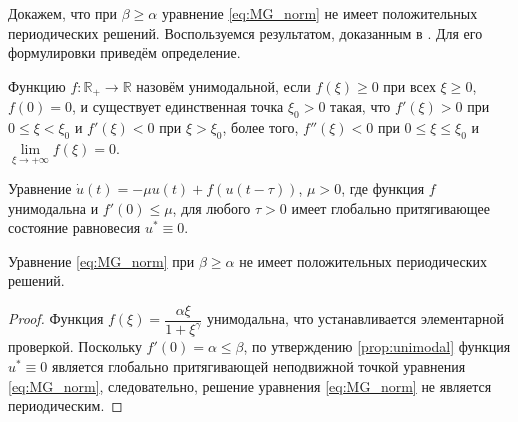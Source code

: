Докажем, что при $\beta \geq \alpha$ уравнение \eqref{eq:MG_norm} не имеет положительных периодических решений. Воспользуемся результатом, доказанным в \cite[Proposition 3.1]{Roest2007}. Для его формулировки приведём определение.

\begin{definition}
	Функцию $f: \mathbb{R}_{+} \to \mathbb{R}$ назовём унимодальной, если $f(\xi) \geq 0$ при всех $\xi \geq 0$, $f(0) = 0$, и существует единственная точка $\xi_0 > 0$ такая, что $f'(\xi) > 0$ при $0 \leq \xi < \xi_0$ и $f'(\xi) < 0$ при $\xi > \xi_0$, более того, $f''(\xi) < 0$ при $0 \leq \xi \leq \xi_0$ и $\lim\limits_{\xi \to +\infty} f(\xi) = 0$.
\end{definition}

\begin{proposition}
	\label{prop:unimodal}
	\cite{Roest2007} Уравнение $\dot{u}(t) = -\mu u(t) + f(u(t - \tau))$, $\mu > 0$, где функция $f$ унимодальна и $f'(0) \leq \mu$, для любого $\tau > 0$ имеет глобально притягивающее состояние равновесия $u^* \equiv 0$.
\end{proposition}
	
\begin{proposition}
	Уравнение \eqref{eq:MG_norm} при $\beta \geq \alpha$ не имеет положительных периодических решений.
\end{proposition}
\begin{proof}
	Функция $f(\xi) = \dfrac{\alpha \xi}{1 + \xi^{\gamma}}$ унимодальна, что устанавливается элементарной проверкой. Поскольку $f'(0) = \alpha \leq \beta$, по утверждению \eqref{prop:unimodal} функция $u^* \equiv 0$ является глобально притягивающей неподвижной точкой уравнения \eqref{eq:MG_norm}, следовательно, решение уравнения \eqref{eq:MG_norm} не является периодическим.
\end{proof}

